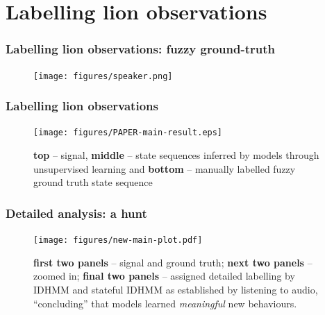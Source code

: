 \documentclass[aspectratio=169]{beamer}
\begin{document}
\section{Labelling lion observations}

\begin{frame}
    \frametitle{Labelling lion observations: fuzzy ground-truth}

    \begin{figure}
        \centering
        \texttt{[image: figures/speaker.png]}
    \end{figure}


\end{frame}




\begin{frame}
    \frametitle{Labelling lion observations}
    \begin{figure}[ht!]
        \texttt{[image: figures/PAPER-main-result.eps]}
        \vspace{-0.5em}
        \caption{{\bf top} --  signal, {\bf middle} -- state sequences inferred by models through unsupervised learning and {\bf bottom} -- manually labelled fuzzy ground truth state sequence}
    \end{figure}
\end{frame}


\begin{frame}
    \frametitle{Detailed analysis: a hunt}
    \begin{figure}
        \texttt{[image: figures/new-main-plot.pdf]}
        \caption{{\bf first two panels} -- signal and ground truth; {\bf next two panels} -- zoomed in; {\bf final two panels} --  assigned detailed labelling by IDHMM and stateful IDHMM as established by listening to audio, ``concluding'' that models learned \emph{meaningful} new behaviours.}
    \end{figure}
\end{frame}





\end{document}
